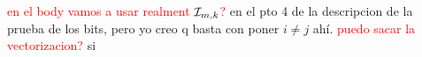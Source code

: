 \textcolor{red}{en el body vamos a usar realment $\mathcal{I}_{m,k}$?} en el pto 4 de la descripcion de la prueba de los bits, pero yo creo q basta con poner $i\neq j$ ah\'i.
\textcolor{red}{puedo sacar la vectorizacion?} si
%
%
%
%
%
